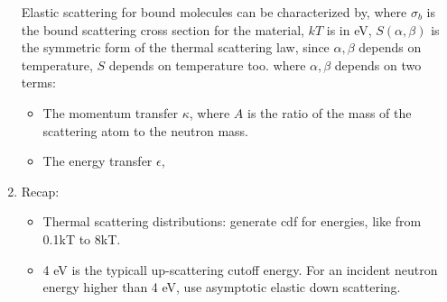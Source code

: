 \documentclass{school-22.211-notes}
\begin{document}
\begin{enumerate}
  Elastic scattering for bound molecules can be characterized by,
  where $\sigma_b$ is the bound scattering cross section for the material, $kT$ is in eV, $S(\alpha, \beta)$ is the symmetric form of the thermal scattering law, since $\alpha, \beta$ depends on temperature, $S$ depends on temperature too. 
  where $\alpha, \beta$ depends on two terms:
  \begin{itemize}
  \item The momentum transfer $\kappa$,
    where $A$ is the ratio of the mass of the scattering atom to the neutron mass.
  \item The energy transfer $\epsilon$,
  \end{itemize}

\item Recap: 
  \begin{itemize}
  \item Thermal scattering distributions: generate cdf for energies, like from 0.1kT to 8kT.  
  \item 4 eV is the typicall up-scattering cutoff energy. For an incident neutron energy higher than 4 eV, use asymptotic elastic down scattering. 
  \end{itemize}
\end{enumerate}
\end{document}
